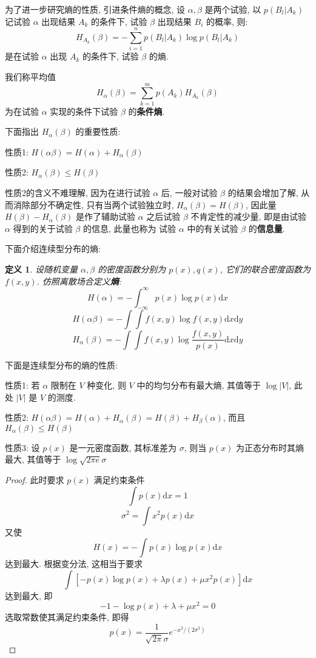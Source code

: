 \documentclass[12pt,a4paper]{article}
\newtheorem{definition}{定义}[subsection] %
\begin{document}
为了进一步研究熵的性质, 引进条件熵的概念, 设 $\alpha, \beta$ 是两个试验, 以 $p(B_l | A_k)$ 记试验 $\alpha$ 出现结果 $A_k$ 的条件下, 试验 $\beta$ 出现结果 $B_i$ 的概率, 则: 
\[H_{A_k}(\beta) = - \sum\limits_{i=1}^n p(B_l | A_k) \log p(B_l | A_k)\] 是在试验 $\alpha$ 出现 $A_k$ 的条件下, 试验 $\beta$ 的熵.

我们称平均值 \[ H_{\alpha}(\beta) = \sum\limits_{k=1}^m p(A_k) H_{A_k}(\beta)\] 为在试验 $\alpha$ 实现的条件下试验 $\beta$ 的\textbf{条件熵}.

下面指出 $H_{\alpha}(\beta)$ 的重要性质: 

性质1: $H(\alpha \beta) = H(\alpha) + H_{\alpha}(\beta)$

性质2: $H_{\alpha}(\beta) \leq H(\beta)$

性质2的含义不难理解, 因为在进行试验 $\alpha$ 后, 一般对试验 $\beta$ 的结果会增加了解, 从而消除部分不确定性, 只有当两个试验独立时, $H_{\alpha}(\beta) = H(\beta)$, 
因此量 $H(\beta) - H_{\alpha}(\beta)$ 是作了辅助试验 $\alpha$ 之后试验 $\beta$ 不肯定性的减少量, 即是由试验 $\alpha$ 得到的关于试验 $\beta$ 的信息, 此量也称为
试验 $\alpha$ 中的有关试验 $\beta$ 的\textbf{信息量}.

下面介绍连续型分布的熵:
\begin{definition}
    设随机变量 $\alpha, \beta$ 的密度函数分别为 $p(x), q(x)$, 它们的联合密度函数为 $f(x,y)$. 仿照离散场合定义\textbf{熵}:
    \[H(\alpha) = -\int_{-\infty}^{\infty} p(x) \log p(x) \mathrm{d}x\]
    \[H(\alpha \beta) = - \int \int f(x,y) \log f(x,y) \mathrm{d}x \mathrm{d}y\]
    \[H_{\alpha}(\beta) = -\int \int f(x,y) \log \frac{f(x,y)}{p(x)} \mathrm{d}x \mathrm{d}y\]
\end{definition}
下面是连续型分布的熵的性质:

性质1: 若 $\alpha$ 限制在 $V$ 种变化, 则 $V$ 中的均匀分布有最大熵, 其值等于 $\log |V|$, 此处 $|V|$ 是 $V$ 的测度.

性质2: $H(\alpha \beta) = H(\alpha) + H_{\alpha}(\beta) = H(\beta) + H_{\beta}(\alpha)$, 而且 $H_{\alpha}(\beta) \leq H(\beta)$

性质3: 设 $p(x)$ 是一元密度函数, 其标准差为 $\sigma$, 则当 $p(x)$ 为正态分布时其熵最大, 其值等于 $\log \sqrt{2\pi e} \sigma$
\begin{proof}
    此时要求 $p(x)$ 满足约束条件 \[\int p(x) \mathrm{d}x = 1 \] \[\sigma^2 = \int x^2 p(x) \mathrm{d}x\]
    又使 \[H(x) = - \int p(x) \log p(x) \mathrm{d}x\] 达到最大. 根据变分法, 这相当于要求
    \[\int \left[-p(x) \log p(x) + \lambda p(x) + \mu x^2 p(x) \right] \mathrm{d}x\] 达到最大, 即
    \[-1 - \log p(x) + \lambda + \mu x^2 = 0\] 选取常数使其满足约束条件, 即得
    \[p(x) = \frac{1}{\sqrt{2\pi}\sigma} e^{- x^2 / (2\sigma^2)}\]
\end{proof}
\end{document}
